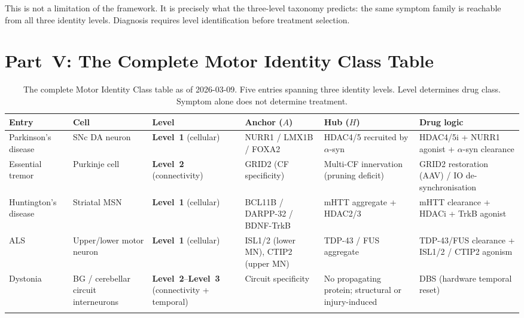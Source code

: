\documentclass[12pt,a4paper]{article}
\newcommand{\Lev}[1]{\textbf{Level~#1}}
\begin{document}
This is not a limitation of the framework. It is precisely what the
three-level taxonomy predicts: the same symptom family is reachable from
all three identity levels. Diagnosis requires level identification before
treatment selection.

\section{Part~V: The Complete Motor Identity Class Table}

\begin{longtable}{p{2cm} p{2cm} p{2cm} p{2.5cm} p{2.5cm} p{2.5cm}}
  \toprule
  \textbf{Entry} & \textbf{Cell} & \textbf{Level} &
  \textbf{Anchor ($A$)} & \textbf{Hub ($H$)} &
  \textbf{Drug logic} \\
  \midrule

  Parkinson's disease &
    SNc DA neuron &
    \Lev{1} (cellular) &
    NURR1 / LMX1B / FOXA2 &
    HDAC4/5 recruited by $\alpha$-syn &
    HDAC4/5i + NURR1 agonist + $\alpha$-syn clearance \\
  \addlinespace

  Essential tremor &
    Purkinje cell &
    \Lev{2} (connectivity) &
    GRID2 (CF specificity) &
    Multi-CF innervation (pruning deficit) &
    GRID2 restoration (AAV) / IO de-synchronisation \\
  \addlinespace

  Huntington's disease &
    Striatal MSN &
    \Lev{1} (cellular) &
    BCL11B / DARPP-32 / BDNF-TrkB &
    mHTT aggregate + HDAC2/3 &
    mHTT clearance + HDACi + TrkB agonist \\
  \addlinespace

  ALS &
    Upper/lower motor neuron &
    \Lev{1} (cellular) &
    ISL1/2 (lower MN), CTIP2 (upper MN) &
    TDP-43 / FUS aggregate &
    TDP-43/FUS clearance + ISL1/2 / CTIP2 agonism \\
  \addlinespace

  Dystonia &
    BG / cerebellar circuit interneurons &
    \Lev{2}--\Lev{3} (connectivity + temporal) &
    Circuit specificity &
    No propagating protein; structural or injury-induced &
    DBS (hardware temporal reset) \\

  \bottomrule
  \caption{The complete Motor Identity Class table as of 2026-03-09.
    Five entries spanning three identity levels. Level determines drug class.
    Symptom alone does not determine treatment.}
\end{longtable}
\end{document}
